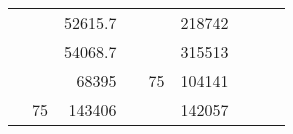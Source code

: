 \begin{table}[H]
\begin{tabular}{|ccrccrccr}
\multicolumn{1}{|c|}{\cellcolor[HTML]{FFFFC7}}                                & \multicolumn{1}{c|}{\cellcolor[HTML]{DAE8FC}}                      & \multicolumn{1}{r|}{\cellcolor[HTML]{DAE8FC}52615.7}   & \multicolumn{1}{c|}{\cellcolor[HTML]{FFFFC7}}                                & \multicolumn{1}{c|}{\cellcolor[HTML]{DAE8FC}}                       & \multicolumn{1}{r|}{\cellcolor[HTML]{DDFDFF}218742}    &                                                                              &                                                                    &                                                        \\ \cline{3-3} \cline{6-6}
\multicolumn{1}{|c|}{\cellcolor[HTML]{FFFFC7}}                                & \multicolumn{1}{c|}{\cellcolor[HTML]{DAE8FC}}                      & \multicolumn{1}{r|}{\cellcolor[HTML]{DDFDFF}54068.7}   & \multicolumn{1}{c|}{\cellcolor[HTML]{FFFFC7}}                                & \multicolumn{1}{c|}{\cellcolor[HTML]{DAE8FC}}                       & \multicolumn{1}{r|}{\cellcolor[HTML]{DAE8FC}315513}    &                                                                              &                                                                    &                                                        \\ \cline{3-3} \cline{6-6}
\multicolumn{1}{|c|}{\cellcolor[HTML]{FFFFC7}}                                & \multicolumn{1}{c|}{\cellcolor[HTML]{DAE8FC}}                      & \multicolumn{1}{r|}{\cellcolor[HTML]{DAE8FC}68395}     & \multicolumn{1}{c|}{\cellcolor[HTML]{FFFFC7}}                                & \multicolumn{1}{c|}{\multirow{-10}{*}{\cellcolor[HTML]{DAE8FC}75}}  & \multicolumn{1}{r|}{\cellcolor[HTML]{DDFDFF}104141}    &                                                                              &                                                                    &                                                        \\ \cline{3-3} \cline{5-6}
\multicolumn{1}{|c|}{\cellcolor[HTML]{FFFFC7}}                                & \multicolumn{1}{c|}{\multirow{-10}{*}{\cellcolor[HTML]{DAE8FC}75}} & \multicolumn{1}{r|}{\cellcolor[HTML]{DDFDFF}143406}    & \multicolumn{1}{c|}{\cellcolor[HTML]{FFFFC7}}                                & \multicolumn{1}{c|}{\cellcolor[HTML]{DDFDFF}}                       & \multicolumn{1}{r|}{\cellcolor[HTML]{DAE8FC}142057}    &                                                                              &                                                                    &                                                        \\ \cline{2-3} \cline{6-6}

\end{tabular}
\end{table}
